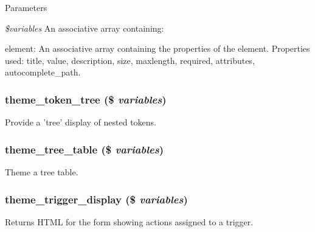 \begin{DoxyParams}{Parameters}
\item[{\em \$variables}]An associative array containing:
\begin{DoxyItemize}
\item element: An associative array containing the properties of the element. Properties used: title, value, description, size, maxlength, required, attributes, autocomplete\_\-path. 
\end{DoxyItemize}\end{DoxyParams}
\hypertarget{group__themeable_ga134bf969c587784a30834201a24284e2}{
\subsubsection[{theme\_\-token\_\-tree}]{\setlength{\rightskip}{0pt plus 5cm}theme\_\-token\_\-tree (\$ {\em variables})}}
\label{group__themeable_ga134bf969c587784a30834201a24284e2}
Provide a 'tree' display of nested tokens. \hypertarget{group__themeable_ga27af1c0cde4fa8fd2b1ac04f516e2ca6}{
\subsubsection[{theme\_\-tree\_\-table}]{\setlength{\rightskip}{0pt plus 5cm}theme\_\-tree\_\-table (\$ {\em variables})}}
\label{group__themeable_ga27af1c0cde4fa8fd2b1ac04f516e2ca6}
Theme a tree table. \hypertarget{group__themeable_gae3ba9f8ddcdcd9514c5988e072a9334c}{
\subsubsection[{theme\_\-trigger\_\-display}]{\setlength{\rightskip}{0pt plus 5cm}theme\_\-trigger\_\-display (\$ {\em variables})}}
\label{group__themeable_gae3ba9f8ddcdcd9514c5988e072a9334c}
Returns HTML for the form showing actions assigned to a trigger.


